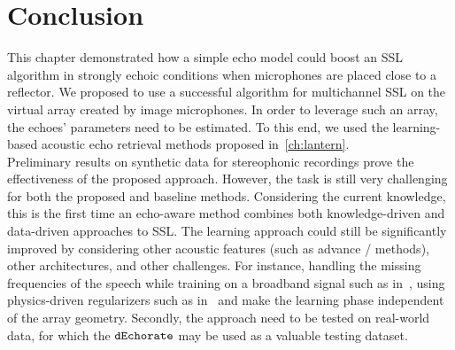 

\section{Conclusion}
This chapter demonstrated how a simple echo model could boost an \ac{SSL} algorithm in strongly echoic conditions when microphones are placed close to a reflector.
We proposed to use a successful algorithm for multichannel \ac{SSL} on the virtual array created by image microphones.
In order to leverage such an array, the echoes' parameters need to be estimated.
To this end, we used the learning-based acoustic echo retrieval methods proposed in~\cref{ch:lantern}.
\\Preliminary results on synthetic data for stereophonic recordings prove the effectiveness of the proposed approach.
However, the task is still very challenging for both the proposed and baseline methods.
Considering the current knowledge, this is the first time an echo-aware method combines both knowledge-driven and data-driven approaches to \ac{SSL}.
The learning approach could still be significantly improved by considering other acoustic features (such as advance \ReTF/ methods), other architectures, and other challenges.
For instance, handling the missing frequencies of the speech while training on a broadband signal such as in~,
using physics-driven regularizers such as in~ and make the learning phase independent of the array geometry.
Secondly, the approach need to be tested on real-world data, for which the $\texttt{dEchorate}$ may be used as a valuable testing dataset.
